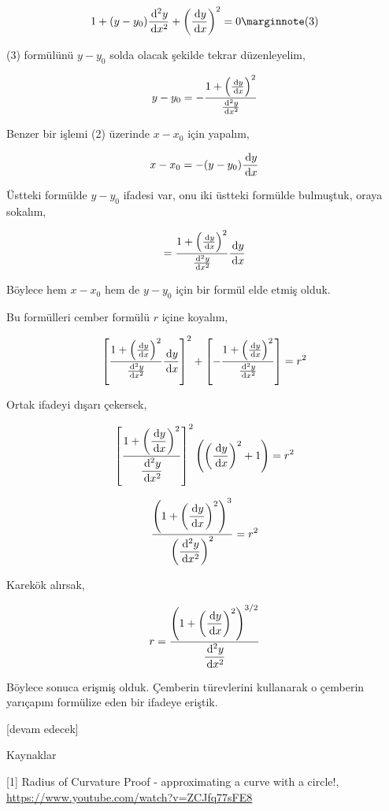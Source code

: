\documentclass[12pt,fleqn]{article}\usepackage{../../common}
\begin{document}
$$
1 + (y-y_0) \frac{\ud^2y}{\ud x^2} +
\left( \frac{\ud y}{\ud x}  \right)^2 = 0
\mlabel{3}
$$

(3) formülünü $y-y_0$ solda olacak şekilde tekrar düzenleyelim,

$$
y-y_0 = - \frac{1 + \left( \frac{\,\mathrm{d} y}{\,\mathrm{d} x}  \right)^2}{\frac{\,\mathrm{d}^2y}{\,\mathrm{d} x^2}}
$$

Benzer bir işlemi (2) üzerinde $x-x_0$ için yapalım,

$$
x-x_0 = -(y-y_0)\frac{\,\mathrm{d} y}{\,\mathrm{d} x}
$$

Üstteki formülde $y-y_0$ ifadesi var, onu iki üstteki formülde bulmuştuk,
oraya sokalım,

$$
= \frac{1 + \left( \frac{\,\mathrm{d} y}{\,\mathrm{d} x}  \right)^2}{\frac{\,\mathrm{d}^2y}{\,\mathrm{d} x^2}}
\frac{\,\mathrm{d} y}{\,\mathrm{d} x}
$$

Böylece hem $x-x_0$ hem de $y-y_0$ için bir formül elde etmiş olduk.

Bu formülleri cember formülü $r$ içine koyalım,

$$
\left[
    \frac{1 + \left( \frac{\,\mathrm{d} y}{\,\mathrm{d} x}  \right)^2}
         {\frac{\,\mathrm{d}^2y}{\,\mathrm{d} x^2}} \frac{\,\mathrm{d} y}{\,\mathrm{d} x}
\right]^2
+
\left[
  - \frac{1 + \left( \frac{\,\mathrm{d} y}{\,\mathrm{d} x}  \right)^2}
         {\frac{\,\mathrm{d}^2y}{\,\mathrm{d} x^2}}
\right] = r^2
$$

Ortak ifadeyi dışarı çekersek, 

$$
\left[
    \dfrac{1 + \left( \dfrac{\,\mathrm{d} y}{\,\mathrm{d} x}  \right)^2}
         {\dfrac{\,\mathrm{d}^2y}{\,\mathrm{d} x^2}}
\right]^2
\left(  \left(\dfrac{\,\mathrm{d} y}{\,\mathrm{d} x}  \right)^2 + 1 \right) = r^2
$$

$$
\frac{\left( 1 +  \left( \dfrac{\,\mathrm{d} y}{\,\mathrm{d} x} \right)^2  \right)^3}
     { \left( \dfrac{\,\mathrm{d}^2y}{\,\mathrm{d} x^2}   \right)^2  }
     = r^2
$$

Karekök alırsak,

$$
r =
\frac{\left( 1 +  \left( \dfrac{\,\mathrm{d} y}{\,\mathrm{d} x} \right)^2  \right)^{3/2}}
     { \dfrac{\,\mathrm{d}^2y}{\,\mathrm{d} x^2}   }
$$


Böylece sonuca erişmiş olduk. Çemberin türevlerini kullanarak o çemberin
yarıçapını formülize eden bir ifadeye eriştik.

     
[devam edecek]

Kaynaklar

[1] Radius of Curvature Proof - approximating a curve with a circle!,
    \url{https://www.youtube.com/watch?v=ZCJfq77sFE8}
\end{document}
